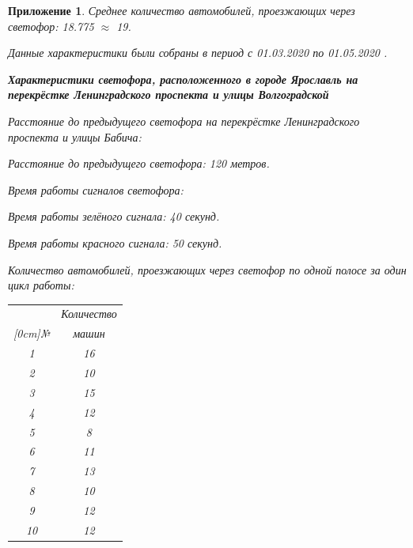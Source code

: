 \documentclass[12pt, a4paper]{extarticle}
\numberwithin{equation}{section}
\newtheorem{attachment}{\hspace{12cm}  Приложение}
\numberwithin{figure}{section}
\begin{document}
\begin{attachment}
\noindent Среднее количество автомобилей, проезжающих через светофор: 18.775 $\approx$ 19.
\newline

\noindent\textup{Данные характеристики были собраны в период с 01.03.2020 по 01.05.2020 }.
\newpage

\textup{\textbf{Характеристики светофора, расположенного в городе Ярославль на перекрёстке Ленинградского проспекта и улицы Волгоградской }}
\newline

\noindent\textup{Расстояние до предыдущего светофора на перекрёстке Ленинградского проспекта и улицы Бабича:}

Расстояние до предыдущего светофора: 120 метров.

\noindent\textup{Время работы сигналов светофора:}

Время работы зелёного сигнала: 40 секунд.

Время работы красного сигнала: 50 секунд.

\noindent\textup{Количество автомобилей, проезжающих через светофор по одной полосе за один цикл работы:}

\begin{table}[h!]
	\begin{minipage}{0.23\linewidth}
		
		\centering
		\begin{tabular}{|c|c|}
			\hline
			& Количество \\ 
			\raisebox{1.5ex}[0cm]{№}
			& машин 
			\\\hline
			1 & 16
			\\\hline
			2 & 10
			\\\hline
			3 & 15
			\\\hline
			4 & 12
			\\\hline
			5 & 8
			\\\hline
			6 & 11
			\\\hline
			7 & 13
			\\\hline
			8 & 10
			\\\hline
			9 & 12
			\\\hline
			10 & 12
			\\\hline
		\end{tabular}
	\end{minipage}
	\begin{minipage}{0.23\linewidth}
		\centering
		

\end{minipage}
\end{table}
\end{attachment}
\end{document}
